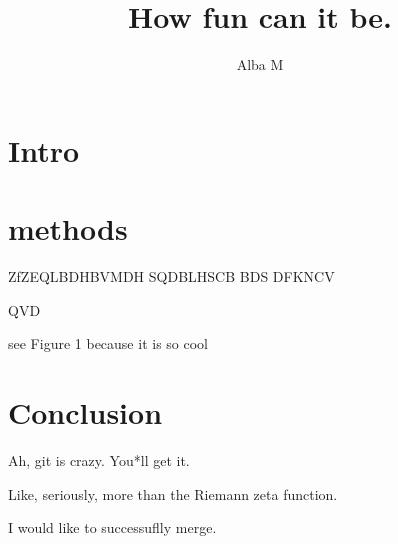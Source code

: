 \documentclass{article}
\author{Alba M}
\title{How fun can it be.}
\begin{document}
	\maketitle
	\section{Intro}
	\section{methods}
	ZfZEQLBDHBVMDH
	SQDBLHSCB
	BDS
	DFKNCV
	
	QVD
	
	see Figure 1 because it is so cool
	
	\section{Conclusion}
	Ah, git is crazy. You*ll get it.
	
	Like, seriously, more than the Riemann zeta function.
	
	I would like to successuflly merge.
	
\end{document}
